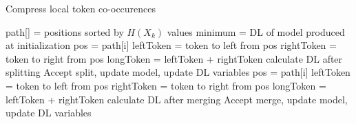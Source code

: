 \documentclass[runningheads]{llncs}
\begin{document}
\begin{algorithm}
	\caption{Compress local token co-occurences}
	\label{local_search}
	\begin{algorithmic}[1]
        \State path[] = positions sorted by $H(X_k)$ values
        \State minimum = DL of model produced at initialization
        \Repeat
                \State pos = path[i]
                    \State leftToken = token to left from pos
                    \State rightToken = token to right from pos 
                    \State longToken = leftToken + rightToken
                    \State calculate DL after splitting
                        \State Accept split, update model, update DL variables
                    \EndIf
                \EndIf
            \EndFor
                \State pos = path[i]
                    \State leftToken = token to left from pos
                    \State rightToken = token to right from pos 
                    \State longToken = leftToken + rightToken
                    \State calculate DL after merging
                        \State Accept merge, update model, update DL variables
                    \EndIf
                \EndIf
            \EndFor
	\end{algorithmic}
\end{algorithm}
\end{document}
